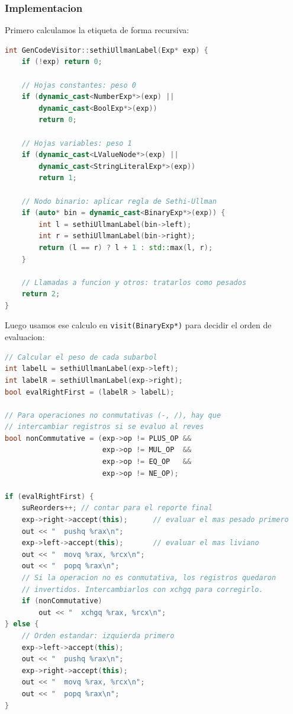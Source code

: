 \documentclass[12pt, a4paper]{article}
\begin{document}
\subsubsection{Implementacion}

Primero calculamos la etiqueta de forma recursiva:

\begin{lstlisting}[language=C++, style=cppstyle, caption={Calculo de etiqueta Sethi-Ullman}]
int GenCodeVisitor::sethiUllmanLabel(Exp* exp) {
    if (!exp) return 0;

    // Hojas constantes: peso 0
    if (dynamic_cast<NumberExp*>(exp) ||
        dynamic_cast<BoolExp*>(exp))
        return 0;

    // Hojas variables: peso 1
    if (dynamic_cast<LValueNode*>(exp) ||
        dynamic_cast<StringLiteralExp*>(exp))
        return 1;

    // Nodo binario: aplicar regla de Sethi-Ullman
    if (auto* bin = dynamic_cast<BinaryExp*>(exp)) {
        int l = sethiUllmanLabel(bin->left);
        int r = sethiUllmanLabel(bin->right);
        return (l == r) ? l + 1 : std::max(l, r);
    }

    // Llamadas a funcion y otros: tratarlos como pesados
    return 2;
}
\end{lstlisting}

Luego usamos ese calculo en \texttt{visit(BinaryExp*)} para decidir el orden de evaluacion:

\begin{lstlisting}[language=C++, style=cppstyle, caption={Aplicacion de Sethi-Ullman en la generacion de codigo}]
// Calcular el peso de cada subarbol
int labelL = sethiUllmanLabel(exp->left);
int labelR = sethiUllmanLabel(exp->right);
bool evalRightFirst = (labelR > labelL);

// Para operaciones no conmutativas (-, /), hay que
// intercambiar registros si se evaluo al reves
bool nonCommutative = (exp->op != PLUS_OP &&
                       exp->op != MUL_OP  &&
                       exp->op != EQ_OP   &&
                       exp->op != NE_OP);

if (evalRightFirst) {
    suReorders++; // contar para el reporte final
    exp->right->accept(this);      // evaluar el mas pesado primero
    out << "  pushq %rax\n";
    exp->left->accept(this);       // evaluar el mas liviano
    out << "  movq %rax, %rcx\n";
    out << "  popq %rax\n";
    // Si la operacion no es conmutativa, los registros quedaron
    // invertidos. Intercambiarlos con xchgq para corregirlo.
    if (nonCommutative)
        out << "  xchgq %rax, %rcx\n";
} else {
    // Orden estandar: izquierda primero
    exp->left->accept(this);
    out << "  pushq %rax\n";
    exp->right->accept(this);
    out << "  movq %rax, %rcx\n";
    out << "  popq %rax\n";
}
\end{lstlisting}
\end{document}

